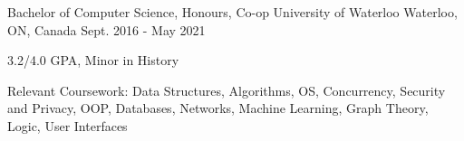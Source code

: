 

\begin{cventries}

  \cventry
    {Bachelor of Computer Science, Honours, Co-op} %
    {University of Waterloo} %
    {Waterloo, ON, Canada} %
    {Sept. 2016 - May 2021} %
    {
      \begin{cvitems} %
	\item {3.2/4.0 GPA, Minor in History}
	\item {Relevant Coursework: Data Structures, Algorithms, OS, Concurrency, Security and Privacy, OOP, Databases, Networks, Machine Learning, Graph Theory, Logic, User Interfaces} 
      \end{cvitems}
    }

\end{cventries}
